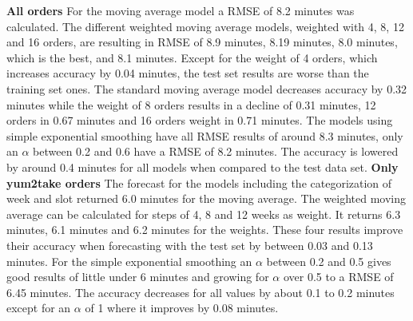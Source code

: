 \newline\newline\textbf{All orders}\newline
For the moving average model a RMSE of 8.2 minutes was calculated. The different weighted moving average models, weighted with 4, 8, 12 and 16 orders, are resulting in RMSE of 8.9 minutes, 8.19 minutes, 8.0 minutes, which is the best, and 8.1 minutes. Except for the weight of 4 orders, which increases accuracy by 0.04 minutes, the test set results are worse than the training set ones. The standard moving average model decreases accuracy by 0.32 minutes while the weight of 8 orders results in a decline of 0.31 minutes, 12 orders in 0.67 minutes and 16 orders weight in 0.71 minutes. The models using simple exponential smoothing have all RMSE results of around 8.3 minutes, only an $\alpha$ between 0.2 and 0.6 have a RMSE of 8.2 minutes. The accuracy is lowered by around 0.4 minutes for all models when compared to the test data set.
\newline\newline\textbf{Only yum2take orders}\newline
The forecast for the models including the categorization of week and slot returned 6.0 minutes for the moving average. The weighted moving average can be calculated for steps of 4, 8 and 12 weeks as weight. It returns 6.3 minutes, 6.1 minutes and 6.2 minutes for the weights. These four results improve their accuracy when forecasting with the test set by between 0.03 and 0.13 minutes. For the simple exponential smoothing an $\alpha$ between 0.2 and 0.5 gives good results of little under 6 minutes and growing for $\alpha$ over 0.5 to a RMSE of 6.45 minutes. The accuracy decreases for all values by about 0.1 to 0.2 minutes except for an $\alpha$ of 1 where it improves by 0.08 minutes.
